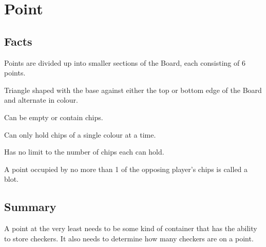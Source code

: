 \section{Point}

\subsection{Facts}

\begin{dashed}
    \item Points are divided up into smaller sections of the Board, each consisting of 6 points.
    \item Triangle shaped with the base against either the top or bottom edge of the Board and alternate in colour.
    \item Can be empty or contain chips.
    \item Can only hold chips of a single colour at a time.
    \item Has no limit to the number of chips each can hold.
    \item A point occupied by no more than 1 of the opposing player’s chips is called a blot.
\end{dashed}


\subsection{Summary}

A point at the very least needs to be some kind of container that has the ability
to store checkers. It also needs to determine how many checkers are on a point.

